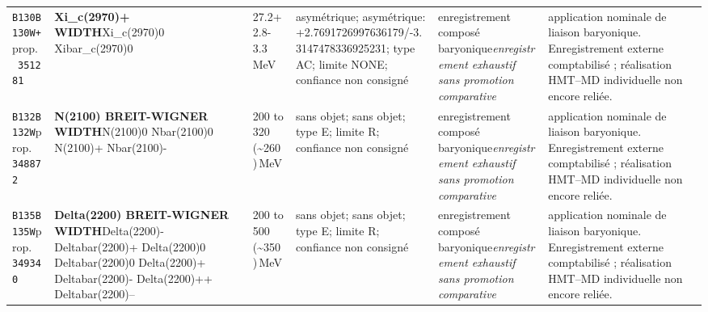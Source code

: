\begin{landscape}
\begin{longtable}{L{1.85cm}L{4.45cm}L{2.35cm}L{4.05cm}L{3.35cm}L{7.15cm}}
\texttt{B130}\newline \texttt{B130W+}\newline prop.\ \texttt{351281} & \textbf{Xi\_\allowbreak{}c(2970)+ WIDTH}\newline Xi\_\allowbreak{}c(2970)0 \textbar{}\allowbreak{} Xibar\_\allowbreak{}c(2970)0 & 27.2+2.8-3.3\,MeV & asymétrique; asymétrique: +2.7691726997636179/-3.3147478336925231; type AC; limite NONE; confiance non consigné & enregistrement composé baryonique\newline \emph{enregistrement exhaustif sans promotion comparative} & application nominale de liaison baryonique. Enregistrement externe comptabilisé ; réalisation HMT--MD individuelle non encore reliée. \\
\texttt{B132}\newline \texttt{B132W}\newline prop.\ \texttt{348872} & \textbf{N(2100) BREIT-WIGNER WIDTH}\newline N(2100)0 \textbar{}\allowbreak{} Nbar(2100)0 \textbar{}\allowbreak{} N(2100)+ \textbar{}\allowbreak{} Nbar(2100)- & 200 to 320 (\textasciitilde{}260)\,MeV & sans objet; sans objet; type E; limite R; confiance non consigné & enregistrement composé baryonique\newline \emph{enregistrement exhaustif sans promotion comparative} & application nominale de liaison baryonique. Enregistrement externe comptabilisé ; réalisation HMT--MD individuelle non encore reliée. \\
\texttt{B135}\newline \texttt{B135W}\newline prop.\ \texttt{349340} & \textbf{Delta(2200) BREIT-WIGNER WIDTH}\newline Delta(2200)- \textbar{}\allowbreak{} Deltabar(2200)+ \textbar{}\allowbreak{} Delta(2200)0 \textbar{}\allowbreak{} Deltabar(2200)0 \textbar{}\allowbreak{} Delta(2200)+ \textbar{}\allowbreak{} Deltabar(2200)- \textbar{}\allowbreak{} Delta(2200)++ \textbar{}\allowbreak{} Deltabar(2200)-- & 200 to 500 (\textasciitilde{}350)\,MeV & sans objet; sans objet; type E; limite R; confiance non consigné & enregistrement composé baryonique\newline \emph{enregistrement exhaustif sans promotion comparative} & application nominale de liaison baryonique. Enregistrement externe comptabilisé ; réalisation HMT--MD individuelle non encore reliée. \\

\end{longtable}
\end{landscape}
